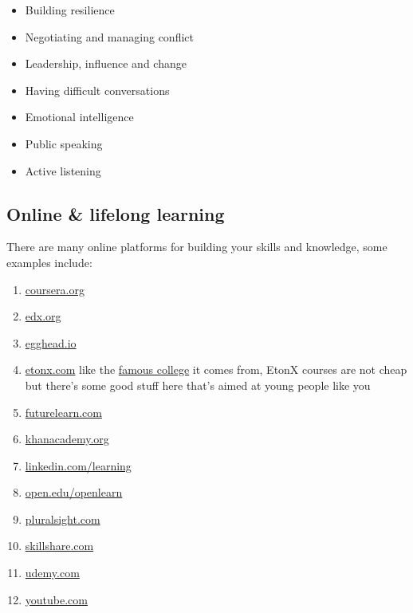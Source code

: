 \documentclass[
]{book}
\providecommand{\tightlist}{%
  \setlength{\itemsep}{0pt}\setlength{\parskip}{0pt}}
\begin{document}
\begin{itemize}
\tightlist
\item
  Building resilience
\item
  Negotiating and managing conflict
\item
  Leadership, influence and change
\item
  Having difficult conversations
\item
  Emotional intelligence
\item
  Public speaking
\item
  Active listening
\end{itemize}

\hypertarget{mooc}{%
\subsection{Online \& lifelong learning}\label{mooc}}

There are many online platforms for building your skills and knowledge, some examples include:

\begin{enumerate}
\def\labelenumi{\arabic{enumi}.}
\tightlist
\item
  \href{https://www.coursera.org}{coursera.org}
\item
  \href{https://www.edx.org}{edx.org}
\item
  \href{https://egghead.io}{egghead.io}
\item
  \href{https://etonx.com}{etonx.com} like the \href{https://en.wikipedia.org/wiki/Eton_College}{famous college} it comes from, EtonX courses are not cheap but there's some good stuff here that's aimed at young people like you
\item
  \href{https://www.futurelearn.com}{futurelearn.com}
\item
  \href{https://www.khanacademy.org}{khanacademy.org}
\item
  \href{https://www.linkedin.com/learning}{linkedin.com/learning}
\item
  \href{https://www.open.edu/openlearn}{open.edu/openlearn}
\item
  \href{https://www.pluralsight.com}{pluralsight.com}
\item
  \href{https://www.skillshare.com}{skillshare.com}
\item
  \href{https://www.udemy.com}{udemy.com}
\item
  \href{https://www.youtube.com}{youtube.com}
\end{enumerate}
\end{document}
